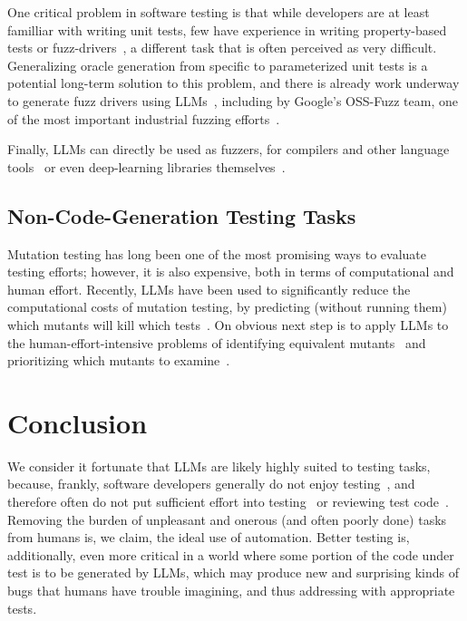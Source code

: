 \documentclass[sigconf,natbib=false]{acmart}
\begin{document}
One critical problem in software testing is that while developers are
at least familliar with writing unit tests, few have experience in
writing property-based tests or fuzz-drivers~\cite{goldstein2022some}, a different task
that is often perceived as very difficult.  Generalizing oracle
generation from specific to parameterized unit tests is a potential
long-term solution to this problem, and there is already work underway
to generate fuzz drivers using LLMs~\cite{zhang2023understanding},
including by Google's OSS-Fuzz team, one of the most important
industrial fuzzing efforts~\cite{ossfuzzllm}.

Finally, LLMs can directly be used as fuzzers, for compilers and other
language tools~\cite{xia2023universal} or even
deep-learning libraries themselves~\cite{LLMFuzz}.

\subsection{Non-Code-Generation Testing Tasks}

Mutation testing has long been one of the most promising ways to
evaluate testing efforts; however, it is also expensive, both in terms
of computational and human effort.  Recently, LLMs have been used to
significantly reduce the computational costs of mutation testing, by
predicting (without running them) which mutants will kill which
tests~\cite{ContextPMT}.  On obvious next step is to apply LLMs to the
human-effort-intensive problems of identifying equivalent
mutants~\cite{TCE} and prioritizing which mutants to examine~\cite{StatMut}.

\section{Conclusion}

We consider it fortunate that LLMs are likely highly suited to testing
tasks, because, frankly, software developers generally do not enjoy
testing~\cite{DevsHateTesting}, and therefore often do not put sufficient effort into
testing~\cite{DevsDontTestEnough} or reviewing test code~\cite{TestCodeReview}.  Removing the burden of unpleasant and onerous (and often
poorly done) tasks from humans is, we claim, the ideal use of
automation.  Better testing is, additionally, even more critical in a
world where some portion of the code under test is to be generated by
LLMs, which may produce new and surprising kinds of bugs that humans
have trouble imagining, and thus addressing with appropriate tests.
\end{document}

